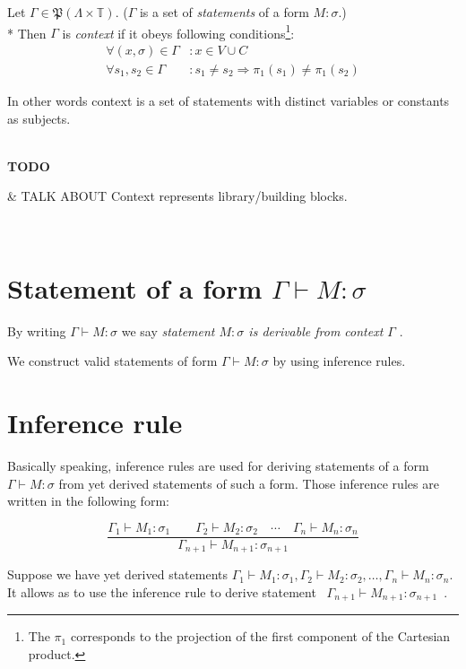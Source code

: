 \documentclass[12pt,a4paper]{report}
\newcommand{\turst}[3]{$#1 \vdash #2 : #3$\xspace}
\newcommand{\GMS}{\turst{\Gamma}{M}{\sigma}}
\newenvironment{todo}
{ ~\\[0.5em]
  \textbf{TODO}
  \begin{easylist}[itemize]}
{ \end{easylist}
  ~}
\begin{document}
	Let $\Gamma \in \mathfrak P \left({\Lambda \times  \mathbb{T}}\right)$. 
	($\Gamma$ is a set of {\it statements} of a form $M : \sigma$.)	\\*
	Then $\Gamma$ is {\it context} if it obeys following 
	conditions\footnote{
	The $\pi_1$ corresponds to the projection of the first component of the Cartesian product.
	}:
	\begin{align*}
		 \forall (x,\sigma) \in \Gamma &: x \in V \cup C \\
		 \forall s_1,s_2 \in \Gamma &: s_1 \neq s_2 \Rightarrow \pi_1(s_1) \neq \pi_1(s_2)
    \end{align*}
    
	In other words context is a set of statements with distinct variables or constants as subjects.
	
\begin{todo}
 & TALK ABOUT Context represents library/building blocks.
\end{todo}

	
	
\section{Statement of a form \GMS}

	By writing \GMS we say 
	{\it statement $M : \sigma$ is derivable from context $\Gamma$ }.

	We construct valid statements of form \GMS by using inference rules.
	
		
\section{Inference rule}		
	
	Basically speaking, inference rules are used for deriving statements of a form 
	\GMS from yet derived statements of such a form.
	Those inference rules are written in the following form:
	
	\begin{equation*}
		\frac{\Gamma_1 \vdash M_1 : \sigma_1 \qquad
			  \Gamma_2 \vdash M_2 : \sigma_2 \quad
			  \dotsm \quad
		      \Gamma_n \vdash M_n : \sigma_n}
		     {\Gamma_{n+1} \vdash M_{n+1} : \sigma_{n+1}}
	\end{equation*}	
	
	Suppose we have yet derived statements 
	$\Gamma_1 \vdash M_1 : \sigma_1 ,
	 \Gamma_2 \vdash M_2 : \sigma_2 ,
	 \dots ,
	 \Gamma_n \vdash M_n : \sigma_n$. 
	It allows as to use the inference rule to derive statement
	\mbox{ $\Gamma_{n+1} \vdash M_{n+1} : \sigma_{n+1}$ }.
	 
\end{document}

